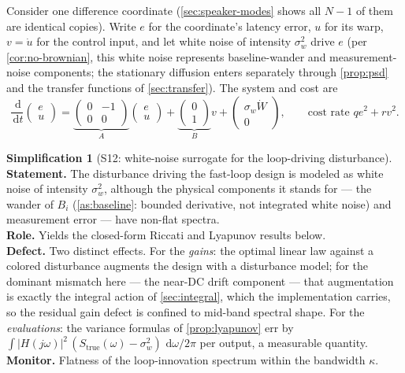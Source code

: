 \documentclass[11pt, a4paper]{article}
\theoremstyle{definition}
\newtheorem{simplification}{Simplification}
\theoremstyle{plain}
\theoremstyle{remark}
\newcommand{\dd}{\,\mathrm{d}}
\begin{document}
Consider one difference coordinate (\cref{sec:speaker-modes} shows all
$N{-}1$ of them are identical copies).  Write $e$ for the coordinate's
latency error, $u$ for its warp, $v = \dot u$ for the control input, and
let white noise of intensity $\sigma_w^2$ drive $e$ (per
\cref{cor:no-brownian}, this white noise represents baseline-wander and
measurement-noise components; the stationary diffusion enters separately
through \cref{prop:psd} and the transfer functions of
\cref{sec:transfer}).  The system and cost are
\begin{equation}\label{eq:lqr-setup}
  \frac{\dd}{\dd t}\begin{pmatrix} e\\ u\end{pmatrix}
  =
  \underbrace{\begin{pmatrix} 0 & -1\\ 0 & 0\end{pmatrix}}_{A}
  \begin{pmatrix} e\\ u\end{pmatrix}
  +
  \underbrace{\begin{pmatrix} 0\\ 1\end{pmatrix}}_{B} v
  + \begin{pmatrix} \sigma_w \dot W\\ 0\end{pmatrix},
  \qquad
  \text{cost rate } q e^2 + r v^2 .
\end{equation}

\setcounter{simplification}{11}%
\begin{simplification}[S12: white-noise surrogate for the loop-driving
disturbance]\label{simp:whitenoise}
\textbf{Statement.}  The disturbance driving the fast-loop design is
modeled as white noise of intensity $\sigma_w^2$, although the physical
components it stands for --- the wander of $B_i$
(\cref{as:baseline}: bounded derivative, not integrated white noise)
and measurement error --- have non-flat spectra.\\
\textbf{Role.}  Yields the closed-form Riccati and Lyapunov results
below.\\
\textbf{Defect.}  Two distinct effects.  For the \emph{gains}: the
optimal linear law against a colored disturbance augments the design
with a disturbance model; for the dominant mismatch here --- the
near-DC drift component --- that augmentation is exactly the integral
action of \cref{sec:integral}, which the implementation carries, so
the residual gain defect is confined to mid-band spectral shape.  For
the \emph{evaluations}: the variance formulas of
\cref{prop:lyapunov} err by
$\int |H(j\omega)|^2\,(S_{\mathrm{true}}(\omega) - \sigma_w^2)
\,\dd\omega/2\pi$ per output, a measurable quantity.\\
\textbf{Monitor.}  Flatness of the loop-innovation spectrum within the
bandwidth $\kappa$.
\end{simplification}
\end{document}
